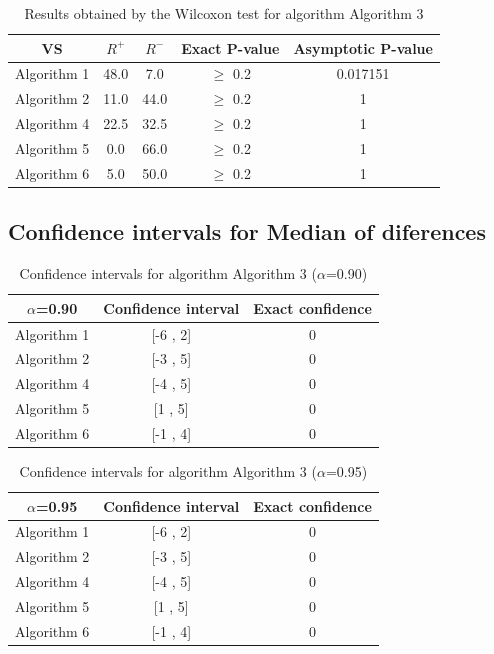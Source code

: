 \documentclass[a4paper,10pt]{article}
\begin{document}
\begin{table}[!htp]
\centering\small
\begin{tabular}{
|c|c|c|c|c|}
\hline
 VS & $R^{+}$ & $R^{-}$ & Exact P-value & Asymptotic P-value \\ \hline 
Algorithm 1 & 48.0 & 7.0 & $\geq$ 0.2 & 0.017151\\ \hline 
Algorithm 2 & 11.0 & 44.0 & $\geq$ 0.2 & 1\\ \hline 
Algorithm 4 & 22.5 & 32.5 & $\geq$ 0.2 & 1\\ \hline 
Algorithm 5 & 0.0 & 66.0 & $\geq$ 0.2 & 1\\ \hline 
Algorithm 6 & 5.0 & 50.0 & $\geq$ 0.2 & 1\\ \hline 

\end{tabular}
\caption{Results obtained by the Wilcoxon test for algorithm Algorithm 3}
\end{table}

\subsection{Confidence intervals for Median of diferences}

\begin{table}[!htp]
\centering\small
\begin{tabular}{
|c|c|c|}
\hline
 $\alpha$=0.90 & Confidence interval & Exact confidence \\ \hline 
Algorithm 1 & [-6 , 2] & 0\\ \hline 
Algorithm 2 & [-3 , 5] & 0\\ \hline 
Algorithm 4 & [-4 , 5] & 0\\ \hline 
Algorithm 5 & [1 , 5] & 0\\ \hline 
Algorithm 6 & [-1 , 4] & 0\\ \hline 

\end{tabular}
\caption{Confidence intervals for algorithm Algorithm 3 ($\alpha$=0.90)}
\end{table}
\begin{table}[!htp]
\centering\small
\begin{tabular}{
|c|c|c|}
\hline
 $\alpha$=0.95 & Confidence interval & Exact confidence \\ \hline 
Algorithm 1 & [-6 , 2] & 0\\ \hline 
Algorithm 2 & [-3 , 5] & 0\\ \hline 
Algorithm 4 & [-4 , 5] & 0\\ \hline 
Algorithm 5 & [1 , 5] & 0\\ \hline 
Algorithm 6 & [-1 , 4] & 0\\ \hline 

\end{tabular}
\caption{Confidence intervals for algorithm Algorithm 3 ($\alpha$=0.95)}
\end{table}
\end{document}
